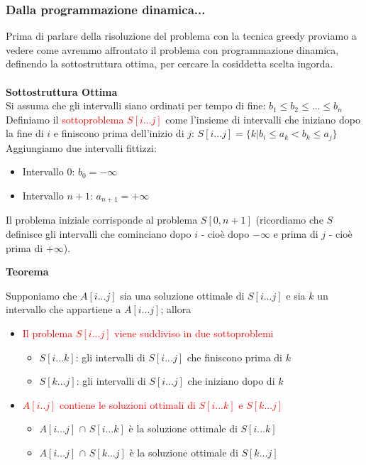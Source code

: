 \documentclass[../cheatSheetAlgoritmi.tex]{subfiles}
\begin{document}
\subsubsection{Dalla programmazione dinamica...}
Prima di parlare della risoluzione del problema con la tecnica greedy proviamo a vedere come avremmo affrontato il problema con programmazione dinamica, definendo la sottostruttura ottima, per cercare la cosiddetta scelta ingorda.\\\\
\textbf{Sottostruttura Ottima}\\
Si assuma che gli intervalli siano ordinati per tempo di fine: $b_1 \leq b_2 \leq ... \leq b_n$\\
Definiamo il \textcolor{red}{sottoproblema $S[i...j]$} come l'insieme di intervalli che iniziano dopo la fine di $i$ e finiscono prima dell'inizio di $j$: $S[i...j] = \{k|b_i \leq a_k < b_k \leq a_j\}$\\
Aggiungiamo due intervalli fittizzi:\\
\begin{itemize}
	\item  Intervallo 0: $b_0 = - \infty$ 
	\item  Intervallo $n+1$: $a_{n+1} = + \infty$ 
\end{itemize}
Il problema iniziale corrisponde al problema $S[0,n+1]$ (ricordiamo che $S$ definisce gli intervalli che cominciano dopo $i$ - cioè dopo $- \infty$ e prima di $j$ - cioè prima di $+ \infty$).
\newpage
\begin{flushleft}
\textbf{Teorema}
\end{flushleft}
Supponiamo che $A[i...j]$ sia una soluzione ottimale di $S[i...j]$ e sia $k$ un intervallo che appartiene a $A[i...j]$; allora
\begin{itemize}
	\item  \textcolor{red}{Il problema $S[i...j]$ viene suddiviso in due sottoproblemi}
		\begin{itemize}
			\item  $S[i...k]$: gli intervalli di $S[i...j]$ che finiscono prima di $k$
			\item  $S[k...j]$: gli intervalli di $S[i...j]$ che iniziano dopo di $k$ 
		\end{itemize}
	\item  \textcolor{red}{$A[i..j]$ contiene le soluzioni ottimali di $S[i...k]$ e $S[k...j]$} 
		\begin{itemize}
			\item  $A[i...j]$ $\cap$ $S[i...k]$ è la soluzione ottimale di $S[i...k]$
			\item  $A[i...j]$ $\cap$ $S[k...j]$ è la soluzione ottimale di $S[k...j]$
		\end{itemize}
\end{itemize}
\end{document}
